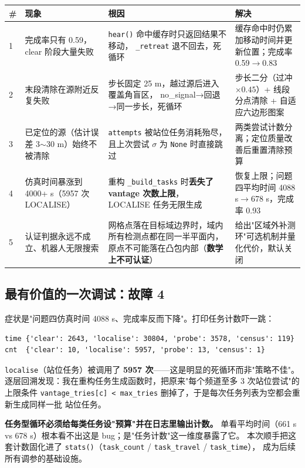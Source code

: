 \begin{longtable}{p{0.55cm}p{4.3cm}p{4.5cm}p{4.7cm}}
\toprule
\# & 现象 & 根因 & 解决 \\ \midrule
\endhead
1 & 完成率只有 0.59，clear 阶段大量失败 & \texttt{hear()} 命中缓存时只返回结果不移动，
\texttt{\_retreat} 退不回去，死循环 & 缓存命中时仍累加移动时间并更新位置；完成率 0.59$\to$0.83 \\
2 & 末段清除在源附近反复失败 & 步长固定 25 m，越过源后进入覆盖角盲区，
no\_signal→回退→同一步长，死循环 & 步长二分（过冲 $\times0.45$）+ 线段分点清除 + 自适应六边形图案 \\
3 & 已定位的源（估计误差 3$\sim$30 m）始终不被清除 & \texttt{attempts} 被站位任务消耗殆尽，
且上次尝试 $\sigma$ 为 \texttt{None} 时直接跳过 & 两类尝试计数分离；定位质量改善后重置清除预算 \\
4 & 仿真时间暴涨到 4000+ s（5957 次 LOCALISE） & 重构 \texttt{\_build\_tasks} 时\textbf{丢失了 vantage 次数上限}，
LOCALISE 任务无限生成 & 恢复上限；问题四平均时间 4088 s$\to$678 s，完成率 0.93 \\
5 & 认证判据永远不成立、机器人无限搜索 & 网格点落在目标域边界时，域内所有检测点都在同一半平面内，
原点不可能落在凸包内部（\textbf{数学上不可认证}） & 给出"区域外补测环"可选机制并量化代价，默认关闭 \\
\bottomrule
\end{longtable}

\subsection{最有价值的一次调试：故障 4}

症状是"问题四仿真时间 4088 s、完成率反而下降"。打印任务计数吓一跳：

\begin{lstlisting}[caption={故障 4 的诊断输出}]
time {'clear': 2643, 'localise': 30804, 'probe': 3578, 'census': 119}
cnt  {'clear': 10, 'localise': 5957, 'probe': 13, 'census': 1}
\end{lstlisting}

\texttt{localise}（站位任务）被调用了 \textbf{5957 次}——这是明显的死循环而非"策略不佳"。
逐层回溯发现：我在重构任务生成函数时，把原来"每个频道至多 3 次站位尝试"的上限条件
\texttt{vantage\_tries[c] < max\_tries} 删掉了，于是每次任务列表为空都会重新生成同样一批
站位任务。

\begin{keybox}[title=经验]
\textbf{任务型循环必须给每类任务设"预算"并在日志里输出计数。}
单看平均时间（661 s vs 678 s）根本看不出这是 bug；是"任务计数"这一维度暴露了它。
本次顺手把这套计数固化进了 \texttt{stats()}（\texttt{task\_count} / \texttt{task\_travel} / \texttt{task\_time}），
成为后续所有调参的基础设施。
\end{keybox}

